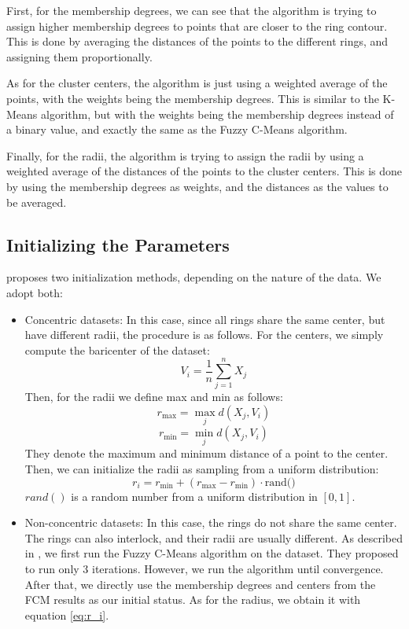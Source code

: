 \documentclass[conference]{IEEEtran}
\begin{document}
First, for the membership degrees, we can see that the algorithm is trying to assign higher membership degrees to points that are closer to the ring contour.
This is done by averaging the distances of the points to the different rings, and assigning them proportionally.

As for the cluster centers, the algorithm is just using a weighted average of the points, with the weights being the membership degrees.
This is similar to the K-Means algorithm, but with the weights being the membership degrees instead of a binary value, and exactly the same as the Fuzzy C-Means algorithm.

Finally, for the radii, the algorithm is trying to assign the radii by using a weighted average of the distances of the points to the cluster centers.
This is done by using the membership degrees as weights, and the distances as the values to be averaged.


\subsection{Initializing the Parameters}
\cite{308484} proposes two initialization methods, depending on the nature of the data. We adopt both:
\begin{itemize}
    \item Concentric datasets: In this case, since all rings share the same center, but have different radii, the procedure is as follows.
    For the centers, we simply compute the baricenter of the dataset:
    \begin{equation}
        V_i = \frac{1}{n} \sum_{j=1}^{n} X_j
    \end{equation}
    Then, for the radii we define max and min as follows:
    \begin{equation}
        r_{\text{max}} = \max_{j} d(X_j, V_i)
    \end{equation}
    \begin{equation}
        r_{\text{min}} = \min_{j} d(X_j, V_i)
    \end{equation}
    They denote the maximum and minimum distance of a point to the center. Then, we can initialize the radii as sampling from a uniform distribution:
    \begin{equation}
        r_i = r_{\text{min}} + (r_{\text{max}} - r_{\text{min}}) \cdot \text{rand()}
    \end{equation}
    $rand()$ is a random number from a uniform distribution in $[0, 1]$.
    \item Non-concentric datasets: In this case, the rings do not share the same center. The rings can also interlock, and their radii are usually different.
    As described in \cite{308484}, we first run the Fuzzy C-Means algorithm on the dataset. They proposed to run only 3 iterations. However, we run the algorithm until convergence.
    After that, we directly use the membership degrees and centers from the FCM results as our initial status. As for the radius, we obtain it with equation \eqref{eq:r_i}.
\end{itemize}
\end{document}
